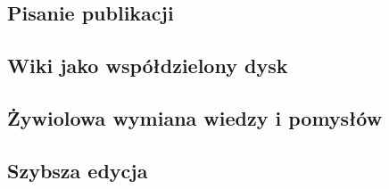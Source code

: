 \documentclass{article}
\begin{document}

	\subsection{Pisanie publikacji}

	\subsection{Wiki jako współdzielony dysk}

\subsection{Żywiolowa wymiana wiedzy i pomysłów}


\subsection{Szybsza edycja}
\end{document}
